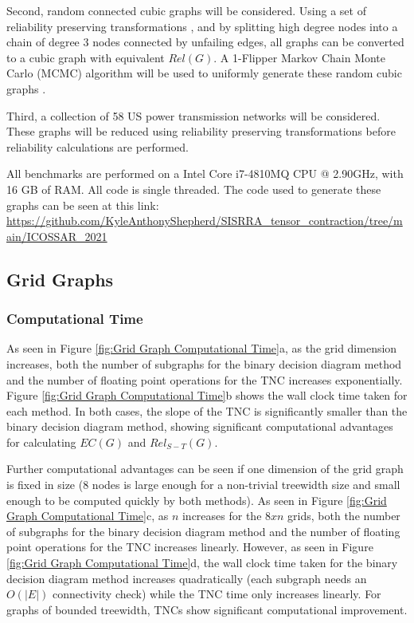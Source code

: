 \documentclass[12pt,twocolumn]{article}
\begin{document}
Second, random connected cubic graphs will be considered. Using a set of reliability preserving transformations \cite{shooman1991exact}, and by splitting high degree nodes into a chain of degree 3 nodes connected by unfailing edges, all graphs can be converted to a cubic graph with equivalent \(Rel(G)\). A 1-Flipper Markov Chain Monte Carlo (MCMC) algorithm will be used to uniformly generate these random cubic graphs \cite{feder2006local}.

Third, a collection of 58 US power transmission networks \cite{li2016characterizing} will be considered. These graphs will be reduced using reliability preserving transformations before reliability calculations are performed.

All benchmarks are performed on a Intel Core i7-4810MQ CPU @ 2.90GHz, with 16 GB of RAM. All code is single threaded. The code used to generate these graphs can be seen at this link: \url{https://github.com/KyleAnthonyShepherd/SISRRA_tensor_contraction/tree/main/ICOSSAR_2021}

\hypertarget{grid-graphs}{%
\subsection{Grid Graphs}\label{grid-graphs}}

\hypertarget{computational-time}{%
\subsubsection{Computational Time}\label{computational-time}}

As seen in Figure \ref{fig:Grid Graph Computational Time}a, as the grid dimension increases, both the number of subgraphs for the binary decision diagram method and the number of floating point operations for the TNC increases exponentially. Figure \ref{fig:Grid Graph Computational Time}b shows the wall clock time taken for each method. In both cases, the slope of the TNC is significantly smaller than the binary decision diagram method, showing significant computational advantages for calculating \(EC(G)\) and \(Rel_{S-T}(G)\).

Further computational advantages can be seen if one dimension of the grid graph is fixed in size (8 nodes is large enough for a non-trivial treewidth size and small enough to be computed quickly by both methods). As seen in Figure \ref{fig:Grid Graph Computational Time}c, as \(n\) increases for the \(8xn\) grids, both the number of subgraphs for the binary decision diagram method and the number of floating point operations for the TNC increases linearly. However, as seen in Figure \ref{fig:Grid Graph Computational Time}d, the wall clock time taken for the binary decision diagram method increases quadratically (each subgraph needs an \(O(|E|)\) connectivity check) while the TNC time only increases linearly. For graphs of bounded treewidth, TNCs show significant computational improvement.
\end{document}

